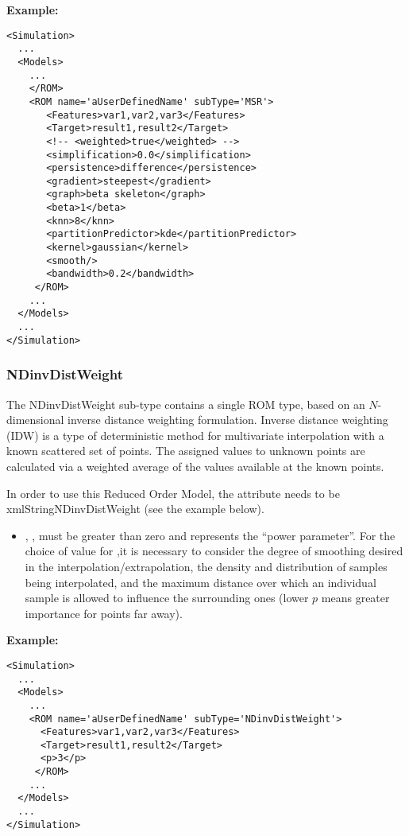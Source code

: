 \textbf{Example:}
\begin{lstlisting}[style=XML,morekeywords={name,subType}]
<Simulation>
  ...
  <Models>
    ...
    </ROM>
    <ROM name='aUserDefinedName' subType='MSR'>
       <Features>var1,var2,var3</Features>
       <Target>result1,result2</Target>
       <!-- <weighted>true</weighted> -->
       <simplification>0.0</simplification>
       <persistence>difference</persistence>
       <gradient>steepest</gradient>
       <graph>beta skeleton</graph>
       <beta>1</beta>
       <knn>8</knn>
       <partitionPredictor>kde</partitionPredictor>
       <kernel>gaussian</kernel>
       <smooth/>
       <bandwidth>0.2</bandwidth>
     </ROM>
    ...
  </Models>
  ...
</Simulation>
\end{lstlisting}

\subsubsection{NDinvDistWeight}
\label{subsubsec:NDinvDistWeight}
The NDinvDistWeight sub-type contains a single ROM type, based on an
$N$-dimensional inverse distance weighting formulation.
%
Inverse distance weighting (IDW) is a type of deterministic method for
multivariate interpolation with a known scattered set of points.
%
The assigned values to unknown points are calculated via a weighted average of
the values available at the known points.
%

In order to use this Reduced Order Model, the  attribute
 needs to be xmlString{NDinvDistWeight} (see the example
below).
%
\subnodeIntro

\begin{itemize}
  \item {}, , must be greater than
  zero and represents the ``power parameter''.
  For the choice of value for ,it is necessary to consider the degree
  of smoothing desired in the interpolation/extrapolation, the density and
  distribution of samples being interpolated, and the maximum distance over
  which an individual sample is allowed to influence the surrounding ones (lower
  $p$ means greater importance for points far away).
\end{itemize}

\textbf{Example:}
\begin{lstlisting}[style=XML,morekeywords={name,subType}]
<Simulation>
  ...
  <Models>
    ...
    <ROM name='aUserDefinedName' subType='NDinvDistWeight'>
      <Features>var1,var2,var3</Features>
      <Target>result1,result2</Target>
      <p>3</p>
     </ROM>
    ...
  </Models>
  ...
</Simulation>
\end{lstlisting}


